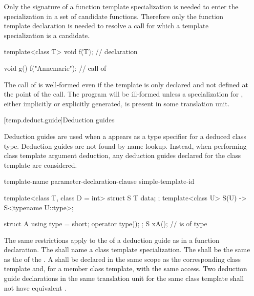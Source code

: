 \pnum
Only the signature of a function template specialization is needed to enter the
specialization in a set of candidate functions.
Therefore only the function template declaration is needed to resolve a call
for which a template specialization is a candidate.
\begin{example}

\begin{codeblock}
template<class T> void f(T);    // declaration

void g() {
  f("Annemarie");               // call of 
}
\end{codeblock}

The call of
is well-formed even if the template
is only declared and not defined at the point of the call.
The program will be ill-formed unless a specialization for
,
either implicitly or explicitly generated,
is present in some translation unit.
\end{example}%

[temp.deduct.guide]{Deduction guides}
%

\pnum
Deduction guides are used
when a  appears
as a type specifier
for a deduced class type.
Deduction guides are not found by name lookup.
Instead, when performing class template argument deduction,
any deduction guides declared for the class template are considered.

\begin{bnf}
\br
     template-name \terminal{(} parameter-declaration-clause \terminal{) ->} simple-template-id \terminal{;}
\end{bnf}

\pnum
\begin{example}
\begin{codeblock}
template<class T, class D = int>
struct S {
  T data;
};
template<class U>
S(U) -> S<typename U::type>;

struct A {
  using type = short;
  operator type();
};
S x{A()};           //  is of type 
\end{codeblock}
\end{example}

\pnum
The same restrictions apply
to the 
of a deduction guide
as in a function declaration.
The 
shall name a class template specialization.
The 
shall be the same 
as the 
of the .
A 
shall be declared
in the same scope
as the corresponding class template
and, for a member class template, with the same access.
Two deduction guide declarations
in the same translation unit
for the same class template
shall not have equivalent .

